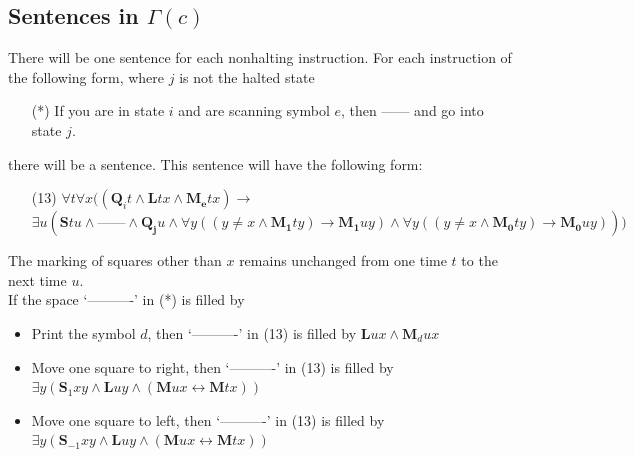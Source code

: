 \documentclass[
11pt,notheorems,hyperref={pdfauthor=whatever}
]{beamer}
\begin{document}
\subsection{Sentences in $\Gamma(c)$}
\begin{frame}
There will be one sentence for each nonhalting instruction. For each instruction of the following form, where $j$ is not the halted state
\vspace{1em}
\begin{enumerate}
    \item[(*)] If you are in state $i$ and are scanning symbol $e$, then ------ and go into state $j$.
\end{enumerate}
\vspace{1em}
there will be a sentence. This sentence will have the following form:
\vspace{1em}
\begin{enumerate}
    \item[(13)] $\forall t\forall x((\pmb{Q}_i t \wedge \pmb{L}tx \wedge \pmb{M_e}tx)\to$\\$\exists u(\pmb{S}tu\wedge \text{------} \wedge \pmb{Q_j}u \wedge \forall y((y\neq x \wedge \pmb{M_1}ty)\to\pmb{M_1}uy)\wedge\forall y((y\neq x\wedge \pmb{M_0}ty)\to\pmb{M_0}uy)))$
\end{enumerate}
\vspace{1em}
The marking of squares other than $x$ remains unchanged from one time $t$ to the next time $u$.\\
If the space ‘——----’ in (*) is filled by
\begin{itemize}
    \item Print the symbol $d$, then ‘——----’ in (13) is filled by $\pmb{L}ux \wedge \pmb{M}_d ux$
    \item Move one square to right, then ‘——----’ in (13) is filled by $\exists y(\pmb{S}_1 xy \wedge \pmb{L}uy \wedge (\pmb{M}ux\leftrightarrow\pmb{M}tx))$
    \item Move one square to left, then ‘——----’ in (13) is filled by $\exists y(\pmb{S}_{-1} xy \wedge \pmb{L}uy \wedge (\pmb{M}ux\leftrightarrow\pmb{M}tx))$
\end{itemize}
\end{frame}
\end{document}
